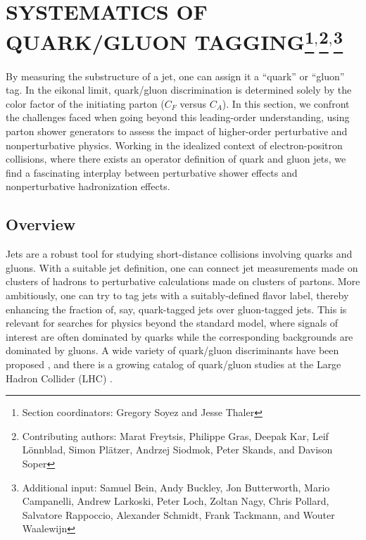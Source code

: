 \documentclass[11pt]{cernrep}
\begin{document}
\section{SYSTEMATICS OF QUARK/GLUON TAGGING\protect\footnote{Section coordinators: Gregory Soyez and Jesse Thaler}$^{,}$\protect\footnote{Contributing authors: Marat Freytsis, Philippe Gras, Deepak Kar, Leif L\"onnblad, Simon Pl\"atzer, Andrzej Siodmok, Peter Skands, and Davison Soper}$^{,}$\protect\footnote{Additional input: Samuel Bein, Andy Buckley, Jon Butterworth, Mario Campanelli, Andrew Larkoski, Peter Loch, Zoltan Nagy, Chris Pollard, Salvatore Rappoccio, Alexander Schmidt, Frank Tackmann, and Wouter Waalewijn}}

By measuring the substructure of a jet, one can assign it a ``quark'' or ``gluon'' tag.  In the eikonal limit, quark/gluon discrimination is determined solely by the color factor of the initiating parton ($C_F$ versus $C_A$).  In this section, we confront the challenges faced when going beyond this leading-order understanding, using parton shower generators to assess the impact of higher-order perturbative and nonperturbative physics.  Working in the idealized context of electron-positron collisions, where there exists an operator definition of quark and gluon jets, we find a fascinating interplay between perturbative shower effects and nonperturbative hadronization effects.

\subsection{Overview}
\label{quarkgluon_sec:overview}

Jets are a robust tool for studying short-distance collisions involving quarks and gluons.  With a suitable jet definition, one can connect jet measurements made on clusters of hadrons to perturbative calculations made on clusters of partons.  More ambitiously, one can try to tag jets with a suitably-defined flavor label, thereby enhancing the fraction of, say, quark-tagged jets over gluon-tagged jets.  This is relevant for searches for physics beyond the standard model, where signals of interest are often dominated by quarks while the corresponding backgrounds are dominated by gluons.  A wide variety of quark/gluon discriminants have been proposed \cite{Gallicchio:2011xq,Gallicchio:2012ez,Krohn:2012fg,Pandolfi:1480598,Chatrchyan:2012sn,Larkoski:2013eya,Larkoski:2014pca}, and there is a growing catalog of quark/gluon studies at the Large Hadron Collider (LHC) \cite{Aad:2014gea,Aad:2014bia,Khachatryan:2014dea,Aad:2015owa,Khachatryan:2015bnx,Aad:2016oit}.
\end{document}
